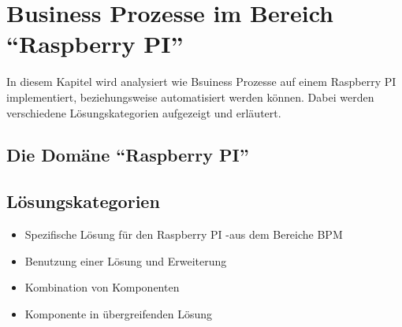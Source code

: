 
\chapter{Business Prozesse im Bereich "`Raspberry PI"'}
In diesem Kapitel wird analysiert wie Bsuiness Prozesse auf einem Raspberry PI implementiert, beziehungsweise automatisiert werden können. Dabei werden verschiedene Lösungskategorien aufgezeigt und erläutert.





\section{Die Domäne "`Raspberry PI"'}



\section{Lösungskategorien}
\begin{itemize}
\item Spezifische Lösung für den Raspberry PI -aus dem Bereiche BPM
\item Benutzung einer Lösung und Erweiterung
\item Kombination von Komponenten
\item Komponente in übergreifenden Lösung
\end{itemize}

